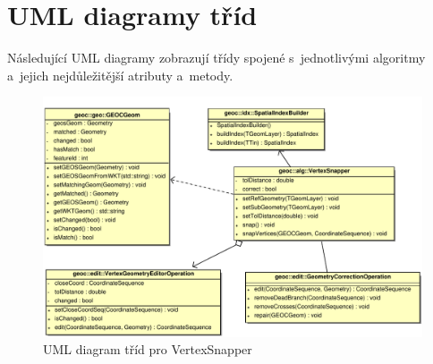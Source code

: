 \chapter{UML diagramy tříd}
\label{priloha-uml}

Následující UML diagramy zobrazují třídy spojené s~jednotlivými 
algoritmy a~jejich nejdůležitější atributy a~metody.

\vspace{2cm}
  \begin{figure}[ht]
    \centering
      \includegraphics[width=420pt]{./pictures/uml-vs.pdf}
      \caption{UML diagram tříd pro VertexSnapper}
      \label{fig:uml-vs}
  \end{figure}

